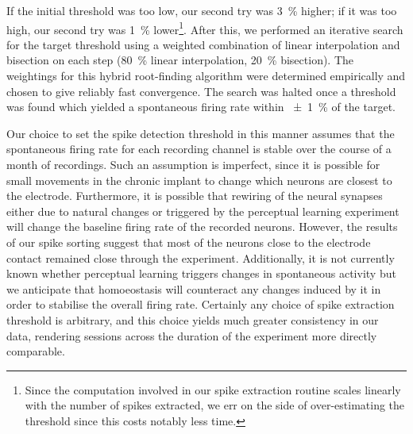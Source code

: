 If the initial threshold was too low, our second try was \SI{3}{\percent} higher; if it was too high, our second try was \SI{1}{\percent} lower\footnote{Since the computation involved in our spike extraction routine scales linearly with the number of spikes extracted, we err on the side of over-estimating the threshold since this costs notably less time.}.
After this, we performed an iterative search for the target threshold using a weighted combination of linear interpolation and bisection on each step (\SI{80}{\percent} linear interpolation, \SI{20}{\percent} bisection).
The weightings for this hybrid root-finding algorithm were determined empirically and chosen to give reliably fast convergence.
The search was halted once a threshold was found which yielded a spontaneous firing rate within \SI{\pm1}{\percent} of the target.

Our choice to set the spike detection threshold in this manner assumes that the spontaneous firing rate for each recording channel is stable over the course of a month of recordings.
Such an assumption is imperfect, since it is possible for small movements in the chronic implant to change which neurons are closest to the electrode.
Furthermore, it is possible that rewiring of the neural synapses either due to natural changes or triggered by the perceptual learning experiment will change the baseline firing rate of the recorded neurons.
However, the results of our spike sorting suggest that most of the neurons close to the electrode contact remained close through the experiment.
Additionally, it is not currently known whether perceptual learning triggers changes in spontaneous activity but we anticipate that homoeostasis will counteract any changes induced by it in order to stabilise the overall firing rate.
Certainly any choice of spike extraction threshold is arbitrary, and this choice yields much greater consistency in our data, rendering sessions across the duration of the experiment more directly comparable.
